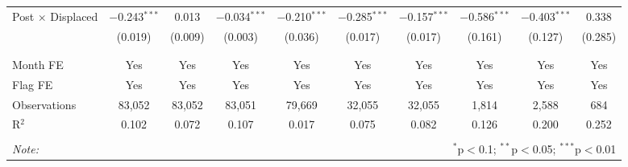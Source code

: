 \begin{table}[H]
\begin{tabular}{@{\extracolsep{1pt}}lccccccccc}
 Post $\times$ Displaced & $-$0.243$^{***}$ & 0.013 & $-$0.034$^{***}$ & $-$0.210$^{***}$ & $-$0.285$^{***}$ & $-$0.157$^{***}$ & $-$0.586$^{***}$ & $-$0.403$^{***}$ & 0.338 \\ 
  & (0.019) & (0.009) & (0.003) & (0.036) & (0.017) & (0.017) & (0.161) & (0.127) & (0.285) \\ 
  & & & & & & & & & \\ 
\hline \\[-1.8ex] 
Month FE & Yes & Yes & Yes & Yes & Yes & Yes & Yes & Yes & Yes \\ 
Flag FE & Yes & Yes & Yes & Yes & Yes & Yes & Yes & Yes & Yes \\ 
Observations & 83,052 & 83,052 & 83,051 & 79,669 & 32,055 & 32,055 & 1,814 & 2,588 & 684 \\ 
R$^{2}$ & 0.102 & 0.072 & 0.107 & 0.017 & 0.075 & 0.082 & 0.126 & 0.200 & 0.252 \\ 
\hline 
\hline \\[-1.8ex] 
\textit{Note:}  & \multicolumn{9}{r}{$^{*}$p$<$0.1; $^{**}$p$<$0.05; $^{***}$p$<$0.01} \\ 
\end{tabular} 
\end{table} 
